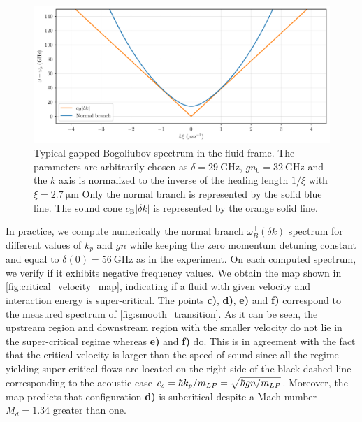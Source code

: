 \begin{figure}[t!]
    \centering
    \includegraphics[width=1\textwidth]{chap_custom_st/fig/sound_cone.pdf}
    \caption{Typical gapped Bogoliubov spectrum in the fluid frame. The parameters are arbitrarily chosen as $\delta=\SI{29}{\giga\hertz}$, $gn_0=\SI{32}{\giga\hertz}$ and the $k$ axis is normalized to the inverse of the healing length $1/\xi$ with $\xi=\SI{2.7}{\micro \meter}$
     Only the normal branch is represented by the solid blue line. The sound cone $c_\mathrm{B}|\delta k|$ is represented by the orange solid line.}
    \label{fig:sound_cone}
\end{figure}


In practice, we compute numerically the  normal branch $\omega_B^+(\delta k)$ spectrum for different values of $k_p$ and $gn$ while keeping the zero momentum detuning constant 
and equal to $\delta(0)=\SI{56}{\giga\hertz}$ as in the experiment. On each computed spectrum, we verify if it exhibits negative frequency values. We obtain the map shown in \autoref{fig:critical_velocity_map}, indicating  if a fluid with given velocity and interaction energy is super-critical. The points \textbf{c)}, \textbf{d)}, \textbf{e)} and \textbf{f)} correspond to the measured spectrum of \autoref{fig:smooth_transition}.
As it can be seen, the upstream region and downstream region with the smaller velocity do not lie in the super-critical regime whereas \textbf{e)} and \textbf{f)} do. This is in agreement with the fact that the critical velocity is larger than the speed of sound since 
all the regime yielding super-critical flows are located on the right side of the black dashed line corresponding to the acoustic case $c_s = \hbar k_p/m_{LP}=\sqrt{\hbar gn/m_{LP}}$. Moreover, the map predicts that configuration \textbf{d)} is subcritical despite a 
Mach number $M_d=1.34$ greater than one.

\bigskip

